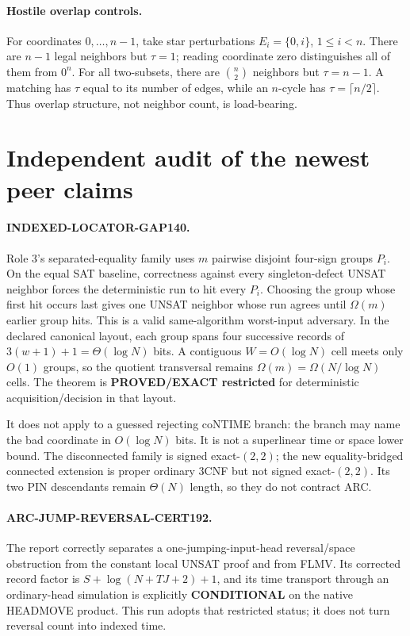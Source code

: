 \documentclass[11pt]{article}
\begin{document}
\paragraph{Hostile overlap controls.}
For coordinates $0,\ldots,n-1$, take star perturbations
$E_i=\{0,i\}$, $1\le i<n$.  There are $n-1$ legal neighbors but
$\tau=1$; reading coordinate zero distinguishes all of them from $0^n$.
For all two-subsets, there are $\binom n2$ neighbors but $\tau=n-1$.  A
matching has $\tau$ equal to its number of edges, while an $n$-cycle has
$\tau=\lceil n/2\rceil$.  Thus overlap structure, not neighbor count, is
load-bearing.

\section{Independent audit of the newest peer claims}
\paragraph{INDEXED-LOCATOR-GAP140.}
Role 3's separated-equality family uses $m$ pairwise disjoint four-sign
groups $P_i$.  On the equal SAT baseline, correctness against every
singleton-defect UNSAT neighbor forces the deterministic run to hit every
$P_i$.  Choosing the group whose first hit occurs last gives one UNSAT
neighbor whose run agrees until $\Omega(m)$ earlier group hits.  This is a
valid same-algorithm worst-input adversary.  In the declared canonical
layout, each group spans four successive records of
$3(w+1)+1=\Theta(\log N)$ bits.  A contiguous $W=O(\log N)$ cell meets only
$O(1)$ groups, so the quotient transversal remains $\Omega(m)=
\Omega(N/\log N)$ cells.  The theorem is \textbf{PROVED/EXACT restricted}
for deterministic acquisition/decision in that layout.

It does not apply to a guessed rejecting coNTIME branch: the branch may name
the bad coordinate in $O(\log N)$ bits.  It is not a superlinear time or
space lower bound.  The disconnected family is signed exact-$(2,2)$; the
new equality-bridged connected extension is proper ordinary 3CNF but not
signed exact-$(2,2)$.  Its two PIN descendants remain $\Theta(N)$ length, so
they do not contract ARC.

\paragraph{ARC-JUMP-REVERSAL-CERT192.}
The report correctly separates a one-jumping-input-head reversal/space
obstruction from the constant local UNSAT proof and from FLMV.  Its corrected
record factor is $S+\log(N+TJ+2)+1$, and its time transport through an
ordinary-head simulation is explicitly \textbf{CONDITIONAL} on the native
HEADMOVE product.  This run adopts that restricted status; it does not turn
reversal count into indexed time.
\end{document}
